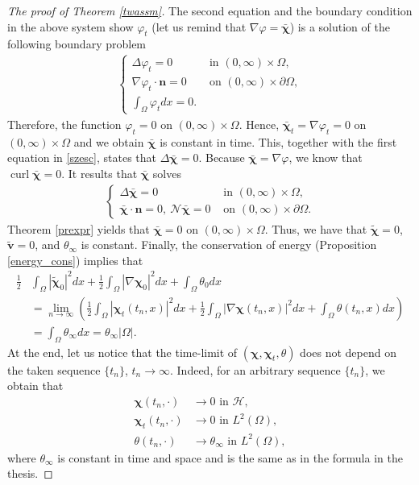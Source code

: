 \documentclass[11pt]{article}
\numberwithin{equation}{section}
\theoremstyle{plain}
\newcommand\bb[1]{\mathbf{#1}}
\newcommand{\tn}{\Omega}
\newcommand{\io}{\int_{\Omega}}
\newcommand{\ld}{L^2(\Omega)}
\DeclareMathOperator{\curl}{curl}
\let \phi\varphi
\newcommand{\ot}{(0,\infty)\times\Omega}
\newcommand{\bs}[1]{\boldsymbol{#1}}
\newcommand{\N}{\mathcal{N}}
\renewcommand{\H}{\mathcal{H}}
\begin{document}
\begin{proof}[The proof of Theorem \ref{twassm}]
The second equation and the boundary condition in the above system show $\phi_t$ (let us remind that $\nabla\phi=\bar{\bs\chi}$) is a solution of the following boundary problem  
\begin{align*}
\begin{cases}
\Delta\phi_t=0 & \text{ in }\ot,\\
\nabla\phi_t\cdot\bb n=0&\text{ on }(0,\infty)\times\partial\Omega,\\
\io\phi_tdx=0.
\end{cases}
\end{align*}
Therefore, the function $\phi_t=0$ on $\ot$. Hence, $\bar{\bs\chi}_t=\nabla\phi_t=0$ on $\ot$ and we obtain $\bar{\bs\chi}$ is constant in time. This, together with the first equation in \eqref{szesc}, states that $\Delta\bar{\bs\chi}=0$. Because $\bar{\bs\chi}=\nabla\phi$, we know that $\curl\bar{\bs\chi}=0$. It results that $\bar{\bs\chi}$ solves
\begin{align*}
\begin{cases}
\Delta\bar{\bs\chi}=0 & \text{ in }\ot,\\
\bar{\bs\chi}\cdot\bb n=0,\ \N\bar{\bs\chi}=0&\text{ on }(0,\infty)\times\partial\Omega.
\end{cases}
\end{align*}
Theorem \ref{prexpr} yields that $\bar{\bs\chi}=0$ on $\ot$. Thus, we have that $\tilde{\bs\chi}=0$, $\tilde{\bb v}=0$, and $\theta_{\infty}$ is constant.
Finally, the conservation of energy (Proposition \ref{energy_cons}) implies that
\begin{align*}
\frac12&\io |\tilde{\bs\chi}_0|^2dx+\frac12\io |\nabla\bs\chi_0|^2dx+\io\theta_0 dx\\
&=\lim_{n\to\infty}\left(\frac12\io |\bs\chi_t(t_n,x)|^2dx+\frac12\io |\nabla\bs\chi(t_n,x)|^2dx+\io\theta(t_n,x) dx\right)\\
&=\io\theta_{\infty} dx=\theta_{\infty}|\tn|.
\end{align*}
At the end, let us notice that the time-limit of $(\bs\chi,\bs\chi_t,\theta)$ does not depend on the taken sequence $\{t_n\}$, $t_n\to\infty$. Indeed, for an arbitrary sequence $\{t_n\}$, we obtain that 
\begin{align*}
\bs\chi(t_n,\cdot)&\to 0\textrm{ in }\H,\\
\bs\chi_t(t_n,\cdot)&\to 0\textrm{ in }\ld,\\
\theta(t_n,\cdot)&\to\theta_{\infty}\textrm{ in }\ld,
\end{align*}
where $\theta_{\infty}$ is constant in time and space and is the same as in the formula in the thesis. 
\end{proof}
\end{document}
